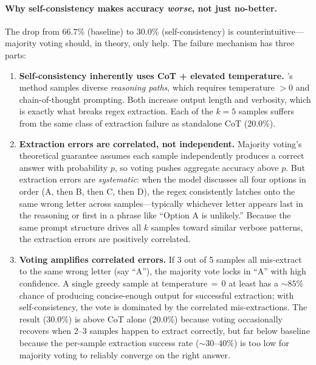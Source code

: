 \documentclass[11pt]{article}
\begin{document}
\paragraph{Why self-consistency makes accuracy \emph{worse}, not just no-better.}
The drop from 66.7\% (baseline) to 30.0\% (self-consistency) is counterintuitive---majority voting should, in theory, only help. The failure mechanism has three parts:

\begin{enumerate}
    \item \textbf{Self-consistency inherently uses CoT + elevated temperature.} \citeauthor{wang2023}'s method samples diverse \emph{reasoning paths}, which requires temperature $> 0$ and chain-of-thought prompting. Both increase output length and verbosity, which is exactly what breaks regex extraction. Each of the $k{=}5$ samples suffers from the same class of extraction failure as standalone CoT (20.0\%).

    \item \textbf{Extraction errors are correlated, not independent.} Majority voting's theoretical guarantee assumes each sample independently produces a correct answer with probability $p$, so voting pushes aggregate accuracy above $p$. But extraction errors are \emph{systematic}: when the model discusses all four options in order (A, then B, then C, then D), the regex consistently latches onto the same wrong letter across samples---typically whichever letter appears last in the reasoning or first in a phrase like ``Option A is unlikely.'' Because the same prompt structure drives all $k$ samples toward similar verbose patterns, the extraction errors are positively correlated.

    \item \textbf{Voting amplifies correlated errors.} If 3 out of 5 samples all mis-extract to the same wrong letter (say ``A''), the majority vote locks in ``A'' with high confidence. A single greedy sample at temperature$\,{=}\,$0 at least has a ${\sim}85\%$ chance of producing concise-enough output for successful extraction; with self-consistency, the vote is dominated by the correlated mis-extractions. The result (30.0\%) is above CoT alone (20.0\%) because voting occasionally recovers when 2--3 samples happen to extract correctly, but far below baseline because the per-sample extraction success rate (${\sim}30$--$40\%$) is too low for majority voting to reliably converge on the right answer.
\end{enumerate}
\end{document}

